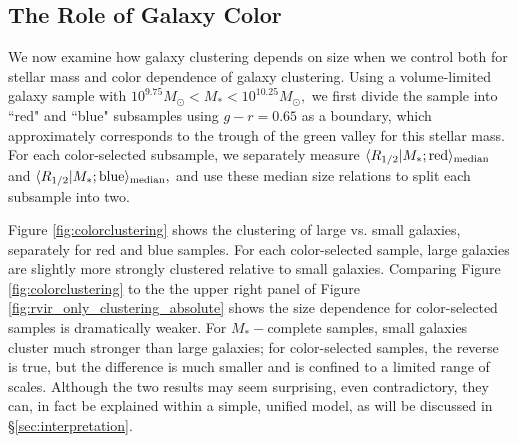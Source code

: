\documentclass[usenatbib,usegraphicx,letterpaper]{mn2e}
\newcommand{\rhalf}{R_{1/2}}
\newcommand{\mstar}{M_{\ast}}
\newcommand{\median}[2]{\langle{#1}\vert{#2}\rangle_{\rm median}}
\newcommand{\msun}{M_\odot}
\begin{document}
\subsection{The Role of Galaxy Color}
\label{subsec:colormorph}

We now examine how galaxy clustering depends on size when we control both for stellar mass and color dependence of galaxy clustering. Using a volume-limited galaxy sample with $10^{9.75}\msun < \mstar< 10^{10.25}\msun,$ we first divide the sample into ``red" and ``blue" subsamples using $g-r=0.65$ as a boundary, which approximately corresponds to the trough of the green valley for this stellar mass. For each color-selected subsample, we separately measure $\median{\rhalf}{\mstar; {\rm red}}$ and $\median{\rhalf}{\mstar; {\rm blue}},$ and use these median size relations to split each subsample into two.

Figure \ref{fig:colorclustering} shows the clustering of large vs. small galaxies, separately for red and blue samples. For each color-selected sample, large galaxies are slightly more strongly clustered relative to small galaxies. Comparing Figure \ref{fig:colorclustering} to the the upper right panel of Figure \ref{fig:rvir_only_clustering_absolute} shows the size dependence for color-selected samples is dramatically weaker.   For $\mstar-$complete samples, small galaxies cluster much stronger than large galaxies; for color-selected samples, the reverse is true, but the difference is much smaller and is confined to a limited range of scales.  Although the two results may seem surprising, even contradictory, they can, in fact be explained within a simple, unified model, as will be discussed in \S\ref{sec:interpretation}.
\end{document}
